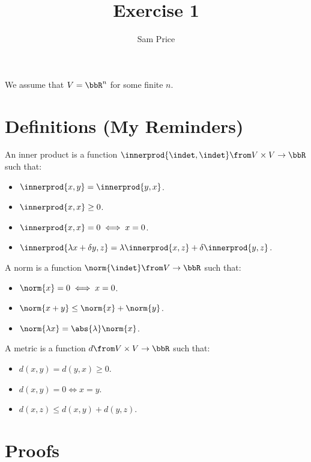\documentclass{article}
\author{Sam Price}
\date{}
\title{Exercise 1}
\begin{document}
\maketitle

We assume that $V = \bbR^{n}$ for some finite $n$.

\section{Definitions (My Reminders)}
\begin{definition}
  An inner product is a function $\innerprod{\indet, \indet} \from V \times V \to \bbR$ such that:
  \begin{itemize}
    \item $\innerprod{x, y} = \innerprod{y, x}$.
    \item $\innerprod{x, x} \ge 0$.
    \item $\innerprod{x, x} = 0 \iff x = 0$.
    \item $\innerprod{\lambda x + \delta y, z} = \lambda \innerprod{x, z} + \delta \innerprod{y, z}$.
  \end{itemize}
\end{definition}
\begin{definition}[Norm]
  A norm is a function $\norm{\indet} \from V \to \bbR$ such that:
  \begin{itemize}
    \item $\norm{x} = 0 \iff x = 0$.
    \item $\norm{x + y} \le \norm{x} + \norm{y}$.
    \item $\norm{\lambda x} = \abs{\lambda}\norm{x}$.
  \end{itemize}
\end{definition}
\begin{definition}[Metric]
  A metric is a function $d \from V \times V \to \bbR$ such that:
  \begin{itemize}
    \item $d(x, y) = d(y, x) \ge 0$.
    \item $d(x, y) = 0 \iff x = y$.
    \item $d(x, z) \le d(x, y) + d(y, z)$.
  \end{itemize}
\end{definition}

\section{Proofs}
\end{document}
